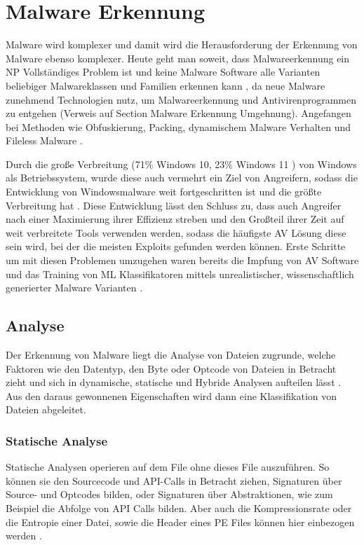 \section{Malware Erkennung}
\label{Sec:Malwaredetektion}
Malware wird komplexer \cite{pascalmaniriho_2023_a}  und damit wird die Herausforderung der Erkennung von Malware ebenso komplexer. Heute geht man soweit, dass Malwareerkennung ein NP Vollständiges Problem ist \cite{ aslan_2020_a,pascalmaniriho_2023_a} und keine Malware Software alle Varianten beliebiger Malwareklassen und Familien erkennen kann \cite{aboaoja_2022_malware}, da neue Malware zunehmend Technologien nutz, um Malwareerkennung und Antivirenprogrammen zu entgehen (Verweis auf Section Malware Erkennung Umgehnung). Angefangen bei Methoden wie Obfuskierung, Packing, dynamischem Malware Verhalten und Fileless Malware \cite{aslan_2020_a}. 

Durch die große Verbreitung (71\% Windows 10, 23\% Windows 11 \cite{Klotz, A}) von Windows als Betriebssystem, wurde diese auch vermehrt ein Ziel von Angreifern, sodass die Entwicklung von Windowsmalware weit fortgeschritten ist und die größte Verbreitung hat \cite{aslan_2020_a}. Diese Entwicklung lässt den Schluss zu, dass auch Angreifer nach einer Maximierung ihrer Effizienz streben und den Großteil ihrer Zeit auf weit verbreitete Tools verwenden werden, sodass die häufigste AV Lösung diese sein wird, bei der die meisten Exploits gefunden werden können. Erste Schritte um mit diesen Problemen umzugehen waren bereits die Impfung von AV Software \cite{murali_2023_evolving} und das Training von ML Klassifikatoren mittels unrealistischer, wissenschaftlich generierter Malware Varianten \cite{dyrmishi_2023_on}.

\subsection{Analyse}
Der Erkennung von Malware liegt die Analyse von Dateien zugrunde, welche Faktoren wie den Datentyp, den Byte oder Optcode von Dateien in Betracht zieht und sich in dynamische, statische und Hybride Analysen aufteilen lässt \cite{aboaoja_2023_a}. Aus den daraus gewonnenen Eigenschaften wird dann eine Klassifikation von Dateien abgeleitet.
\subsubsection{Statische Analyse}
\label{analyse:statisch}
Statische Analysen operieren auf dem File ohne dieses File auszuführen. So können sie den Sourcecode und API-Calls in Betracht ziehen, Signaturen über Source- und Optcodes bilden, oder Signaturen über Abstraktionen, wie zum Beispiel die Abfolge von API Calls\cite{pascalmaniriho_2023_apimaldetect} bilden. Aber auch die Kompressionsrate oder die Entropie einer Datei, sowie die Header eines PE Files können hier einbezogen werden \cite{aboaoja_2023_a, aslan_2020_a}. 

